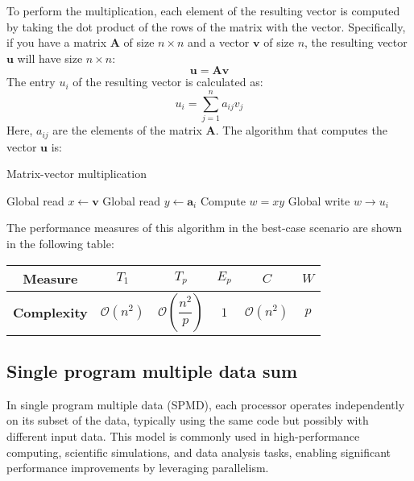 To perform the multiplication, each element of the resulting vector is computed by taking the dot product of the rows of the matrix with the vector. 
Specifically, if you have a matrix $\mathbf{A}$ of size $n\times n$ and a vector $\mathbf{v}$ of size $n$, the resulting vector $\mathbf{u}$ will have size $n\times n$:
\[\mathbf{u}=\mathbf{Av}\]
The entry $u_i$ of the resulting vector is calculated as:
\[u_i=\sum_{j=1}^na_{ij}v_j\]
Here, $a_{ij}$ are the elements of the matrix $\mathbf{A}$. 
The algorithm that computes the vector $\mathbf{u}$ is:
\begin{algorithm}[H]
    \caption{Matrix-vector multiplication}
    \begin{algorithmic}[1]
        \State Global read $x \leftarrow \mathbf{v}$ 
        \State Global read $y \leftarrow \mathbf{a}_{i}$ 
        \State Compute $w = x y$ 
        \State Global write $w \rightarrow u_i$ 
    \end{algorithmic}
\end{algorithm}  
The performance measures of this algorithm in the best-case scenario are shown in the following table:
\renewcommand*{\arraystretch}{2}
\begin{table}[H]
    \centering
    \begin{tabular}{|c|ccccc|}
    \hline
    \textbf{Measure} & $T_1$ & $T_p$ & $E_p$ & $C$ & $W$  \\ \hline
    \textbf{Complexity} &$\mathcal{O}(n^2)$ & $\mathcal{O}\left(\dfrac{n^2}{p}\right)$ & $1$ & $\mathcal{O}(n^2)$ & $p$ \\ \hline
    \end{tabular}
\end{table}
\renewcommand*{\arraystretch}{1}

\subsection{Single program multiple data sum}
In single program multiple data (SPMD), each processor operates independently on its subset of the data, typically using the same code but possibly with different input data. 
This model is commonly used in high-performance computing, scientific simulations, and data analysis tasks, enabling significant performance improvements by leveraging parallelism. 


